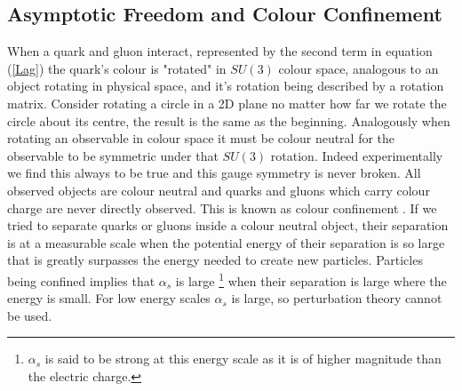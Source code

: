 \documentclass[12pt, onecolumn, nofootinbib]{revtex4}    %
\begin{document}
\subsection{Asymptotic Freedom and Colour Confinement} \label{colour}

 When a quark and gluon interact, represented by the second term in equation (\ref{Lag}) the quark's colour is "rotated" in ${SU(3)}$ colour space, analogous to an object rotating in physical space, and it's rotation being described by a rotation matrix. Consider rotating a circle in a 2D plane no matter how far we rotate the circle about its centre, the result is the same as the beginning. Analogously when rotating an observable in colour space it must be colour neutral for the observable to be symmetric under that ${SU(3)}$ rotation. Indeed experimentally we find this always to be true and this gauge symmetry is never broken. All observed objects are colour neutral and quarks and gluons which carry colour charge are never directly observed. This is known as colour confinement \cite{BOOK}. If we tried to separate quarks or gluons inside a colour neutral object, their separation is at a measurable scale when the potential energy of their separation is so large that is greatly surpasses the energy needed to create new particles. Particles being confined implies that ${\alpha_s}$ is large \footnote{ ${\alpha _s}$ is said to be strong at this energy scale as it is of higher magnitude than the electric charge.} when their separation is large where the energy is small. For low energy scales ${\alpha_s}$ is large, so perturbation theory cannot be used.  
 
\end{document}
